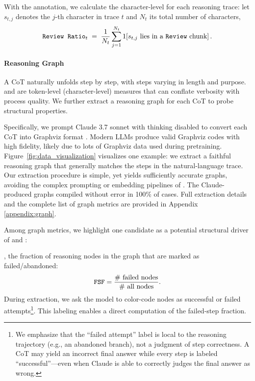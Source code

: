 With the annotation, we calculate the character-level \rr for each reasoning trace: let $s_{t,j}$ denotes the $j$-th character in trace $t$ and $N_t$ its total number of characters,
\[
\texttt{Review Ratio}_t \;=\; \frac{1}{N_t}\sum_{j=1}^{N_t} {1}\!\left[s_{t,j}\ \text{lies in a }\texttt{Review}\ \text{chunk}\right].
\]



\paragraph{Reasoning Graph} A CoT naturally unfolds step by step, with steps varying in length and purpose. \Length and \rr are token-level (character-level) measures that can conflate verbosity with process quality. We further extract a reasoning graph for each CoT to probe structural properties.

Specifically, we prompt Claude 3.7 sonnet with thinking disabled to convert each CoT into Graphviz format \citep{gansner2009drawing}. Modern LLMs produce valid Graphviz codes with high fidelity, likely due to lots of Graphviz data used during pretraining. Figure~\ref{fig:data_visualization} visualizes one example: we extract a faithful reasoning graph that generally matches the steps in the natural-language trace. Our extraction procedure is simple, yet yields sufficiently accurate graphs, avoiding the complex prompting or embedding pipelines of \citet{jiang2025makes, minegishi2025topology}. The Claude-produced graphs compiled without error in 100\% of cases. Full extraction details and the complete list of graph metrics are provided in Appendix \ref{appendix:graph}.

Among graph metrics, we highlight one candidate as a potential structural driver of \Length and \rr:

\failedstep, the fraction of reasoning nodes in the graph that are marked as failed/abandoned:
$$
\texttt{FSF} = \frac{\text{\# failed nodes}}{\text{\# all nodes}}.
$$
During extraction, we ask the model to color-code nodes as successful or failed attempts\footnote{We emphasize that the “failed attempt” label is local to the reasoning trajectory (e.g., an abandoned branch), not a judgment of step correctness. A CoT may yield an incorrect final answer while every step is labeled “successful”—even when Claude is able to correctly judges the final answer as wrong.}. This labeling enables a direct computation of the failed-step fraction. 

